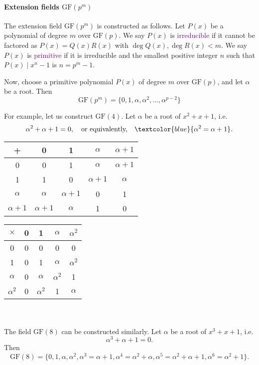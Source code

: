 \documentclass[a4paper, 11pt, openany]{book}
\numberwithin{equation}{section}
\theoremstyle{plain}
\theoremstyle{definition}
\newcommand{\GF}{\mathrm{GF}}
\newcommand{\Structure}[1]{\textcolor{blue}{#1}}
\newcommand{\Define}[1]{\textcolor{purple}{#1}}
\begin{document}
\paragraph{Extension fields $\GF(p^m)$}
The extension field $\GF(p^m)$ is constructed as follows. Let $P(x)$ be a polynomial of degree $m$ over $\GF(p)$. We say $P(x)$ is \Define{irreducible} if it cannot be factored as $P(x) = Q(x)R(x)$ with $\deg Q(x), \deg R(x) < m$. We say $P(x)$ is \Define{primitive} if it is irreducible and the smallest positive integer $n$ such that $P(x) \mid x^n - 1$ is $n = p^m-1$.

Now, choose a primitive polynomial $P(x)$ of degree $m$ over $\GF(p)$, and let $\alpha$ be a root. Then 
\[
    \GF(p^m) = \{ 0, 1, \alpha, \alpha^2, \dots, \alpha^{p-2} \}
\]



For example, let us construct $\GF(4)$. Let $\alpha$ be a root of $x^2 + x + 1$, i.e. 
\[
	\alpha^2 + \alpha + 1 = 0, \quad \mbox{or equivalently,} \quad \Structure{\alpha^2 = \alpha+1}.
\]


\begin{tabular}{c|c|c|c|c|}
	+ & 0 & 1 & $\alpha$ & $\alpha+1$\\
	\hline
	0 & 0 & 1 & $\alpha$ & $\alpha+1$\\
	\hline
	1 & 1 & 0 & $\alpha+1$ & $\alpha$\\
	\hline
	$\alpha$ & $\alpha$ & $\alpha+1$ & 0 & 1\\
	\hline
	$\alpha+1$ & $\alpha+1$ & $\alpha$ & 1 & 0\\
	\hline
\end{tabular}
\hfill
\begin{tabular}{c|c|c|c|c|}
	$\times$ & 0 & 1 & $\alpha$ & $\alpha^2$\\
	\hline
	0 & 0 & 0 & 0 & 0\\
	\hline
	1 & 0 & 1 & $\alpha$ & $\alpha^2$\\
	\hline
	$\alpha$ & 0 & $\alpha$ & $\alpha^2$ & 1\\
	\hline
	$\alpha^2$ & 0 & $\alpha^2$ & 1 & $\alpha$\\
	\hline
\end{tabular}
~\\
~\\
The field $\GF(8)$ can be constructed similarly. Let $\alpha$ be a root of $x^3 + x + 1$, i.e. 
\[
	\alpha^3 + \alpha + 1 = 0.
\]
Then 
\[
    \GF(8) = \{0,1,\alpha,\alpha^2,\alpha^3  = \alpha+1, \alpha^4 = \alpha^2 + \alpha, \alpha^5 = \alpha^2 + \alpha + 1, \alpha^6 = \alpha^2 + 1\}.
\]
\end{document}
